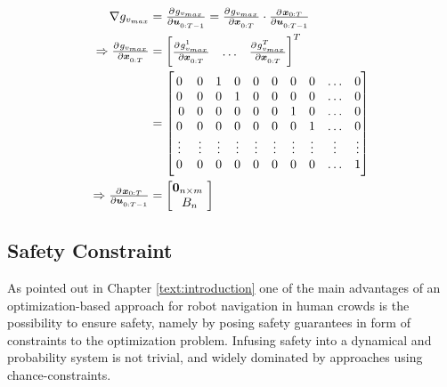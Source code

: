 \begin{align}
\nabla g_{v_{max}} &= \pd{g_{v_{max}}}{\u_{0:T-1}} = \pd{g_{v_{max}}}{\x_{0:T}} \cdot \pd{\x_{0:T}}{\u_{0:T-1}} \\
\Rightarrow \pd{g_{v_{max}}}{\x_{0:T}} &= \begin{bmatrix} \pd{g_{v_{max}}^1}{\x_{0:T}} & \hdots & \pd{g_{v_{max}}^T}{\x_{0:T}}\end{bmatrix}^T  \\
&= \begin{bmatrix} 
0 & 0 & 1 & 0 & 0 & 0 & 0 & 0 & \hdots & 0 \\ 
0 & 0 & 0 & 1 & 0 & 0 & 0 & 0 & \hdots & 0 \\  
0 & 0 & 0 & 0 & 0 & 0 & 1 & 0 & \hdots & 0 \\
0 & 0 & 0 & 0 & 0 & 0 & 0 & 1 & \hdots & 0 \\ 
\vdots & \vdots & \vdots & \vdots & \vdots & \vdots & \vdots & \vdots & \vdots & \vdots \\
0 & 0 & 0 & 0 & 0 & 0 & 0 & 0 & \hdots & 1 \end{bmatrix} \\
\Rightarrow \pd{\x_{0:T}}{\u_{0:T-1}} &= \begin{bmatrix} \mathbf{0}_{n \times m} \\ B_n \end{bmatrix}
\end{align}
 

\subsection{Safety Constraint}
\label{text:approach/constraint/safety}
As pointed out in Chapter \ref{text:introduction} one of the main advantages of an optimization-based approach for robot navigation in human crowds is the possibility to ensure safety, namely by posing safety guarantees in form of constraints to the optimization problem. Infusing safety into a dynamical and probability system is not trivial, and widely dominated by approaches using chance-constraints. 

